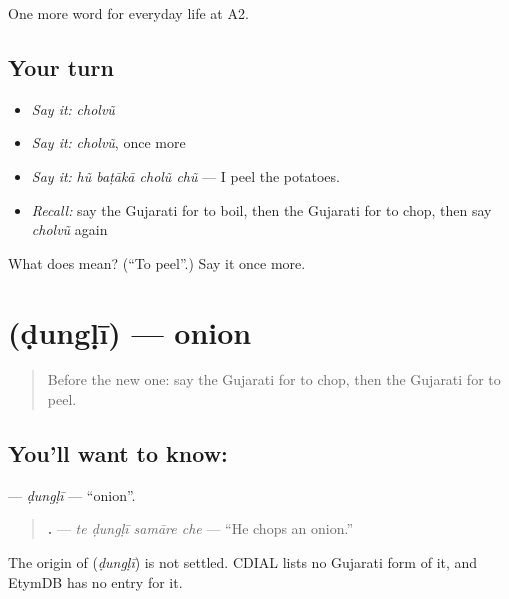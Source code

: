 \begin{grammarlens}[title={What you've built}]
One more word for everyday life at A2.
\end{grammarlens}

\subsection*{Your turn}
\begin{itemize}
\raggedright
  \item \emph{Say it:} \emph{cholvũ}
  \item \emph{Say it:} \emph{cholvũ}, once more
  \item \emph{Say it:} \emph{hũ baṭākā cholũ chũ} — I peel the potatoes.
  \item \emph{Recall:} say the Gujarati for to boil, then the Gujarati for to chop, then say \emph{cholvũ} again
\end{itemize}

\begin{tcolorbox}[breakable,colback=teal!4,colframe=teal!35!black,title={Before you move on}]
What does  mean? (\textquotedblleft{}To peel\textquotedblright{}.) Say it once more.
\end{tcolorbox}
\section[\texorpdfstring{\gu{ડુંગળી} (ḍungḷī)}{ડુંગળી (ḍungḷī)}]{ (ḍungḷī) — onion}

\label{lesson:GU-C166-dungli}



\begin{quote}
Before the new one: say the Gujarati for to chop, then the Gujarati for to peel.
\end{quote}

\subsection*{You'll want to know: }
\textbf{} — \emph{ḍungḷī} — \textquotedblleft{}onion\textquotedblright{}.

\begin{quote}
\textbf{   .} — \emph{te ḍungḷī samāre che} — \textquotedblleft{}He chops an onion.\textquotedblright{}
\end{quote}

\begin{cousinweb}
The origin of \textbf{} (\emph{ḍungḷī}) is not settled. CDIAL lists no Gujarati form of it, and EtymDB has no entry for it.
\end{cousinweb}

